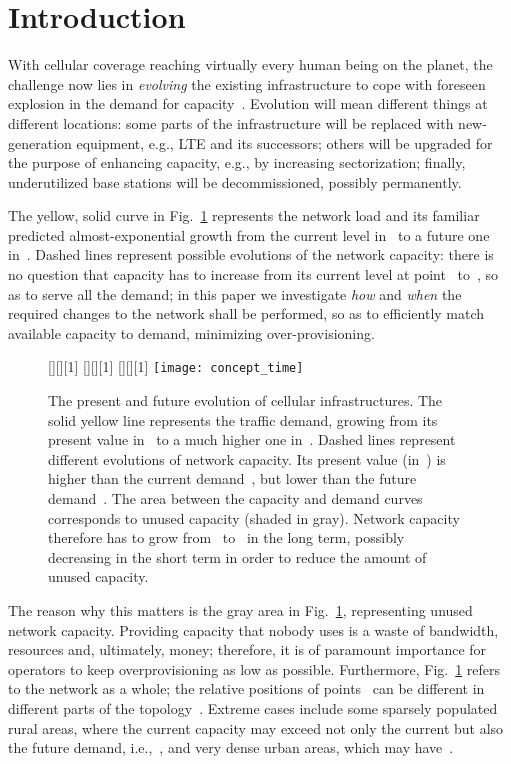 \documentclass[10pt,journal,cspaper,compsoc]{IEEEtran}
\newcommand{\Fig}[1]{Fig.~\ref{fig:#1}}
\begin{document}
\section{Introduction}
\label{sec:intro}

With cellular coverage reaching virtually every human being on the planet, the challenge now lies in
{\em evolving} the existing infrastructure to cope with foreseen explosion in the 
demand for capacity~\cite{cisco}.
Evolution will mean different things at different locations: some parts of the infrastructure will be replaced 
with new-generation equipment, e.g., LTE and its successors; others will be upgraded for the purpose of enhancing 
capacity, e.g., by increasing sectorization; finally, underutilized base stations will be decommissioned, 
possibly permanently.

The yellow, solid curve in \Fig{concept} represents the network load and its familiar predicted
almost-exponential growth from the current level in~ to a future one in~.
Dashed lines represent possible evolutions of the network capacity:
there is no question that capacity has to increase from its current level at point~ to~,
so as to serve all the demand; in this paper we investigate {\em how} and {\em when} the required changes to the network shall be performed,
so as to efficiently match available capacity to demand, minimizing over-provisioning.

\begin{figure}[t!]
[][][1]{}
[][][1]{}
[][][1]{}
\centering
	\texttt{[image: concept\_time]}
	\caption{The present and future evolution of cellular infrastructures. The solid yellow line represents the traffic demand, growing from its present value in~ to a much higher one in~. Dashed lines represent different evolutions of network capacity.
	Its present value (in~) is higher than the current demand~, but lower than the future demand~.
	The area between the capacity and demand curves corresponds to unused capacity (shaded in gray).
	Network capacity therefore has to grow from~ to~ in the long term, possibly decreasing in the short term in order to reduce the amount of unused capacity.
	}
	\label{fig:concept}
\end{figure}

The reason why this matters is the gray area in \Fig{concept}, representing unused network capacity.
Providing capacity that nobody uses is a waste of bandwidth, resources and, ultimately, money; therefore, it is of paramount importance for operators to keep overprovisioning as low as possible.
Furthermore, \Fig{concept} refers to the network as a whole; the relative positions of points~
can be different in different parts of the topology~\cite{difrancesco2014}.
Extreme cases include some sparsely populated rural areas, where the current capacity may exceed
not only the current but also the future demand, i.e.,~, and very dense urban areas, which may have~.
\end{document}
